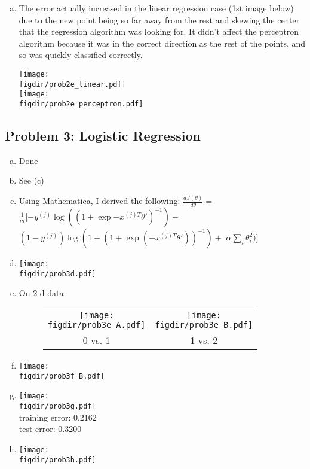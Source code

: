 \documentclass[twoside,11pt]{article}
\newcommand{\figdir}{figs}
\theoremstyle{definition}
\begin{document}
\begin{enumerate}[(a)]
\item The error actually increased in the linear regression case (1st image below) due to the new point being so far away from the rest and skewing the center that the regression algorithm was looking for.
It didn't affect the perceptron algorithm because it was in the correct direction as the rest of the points, and so was quickly classified correctly.

\texttt{[image: \\figdir/prob2e\_linear.pdf]} \\
\texttt{[image: \\figdir/prob2e\_perceptron.pdf]}

\end{enumerate}


\subsection*{Problem 3: Logistic Regression}

\begin{enumerate}[(a)]
\item Done
\item See (c)

\item Using Mathematica, I derived the following:
$\frac{d J(\theta)}{d\theta} =$ $\frac{1}{m}[-y^{(j)}\log((1+\exp{-x^{(j)T}\theta'})^{-1}) - $
$(1-y^{(j)})\log(1-(1+\exp(-x^{(j)T}\theta'))^{-1}) +$ $\alpha\sum_i\theta_i^{2})]$ \\


\item \texttt{[image: \\figdir/prob3d.pdf]}

\item On 2-d data:
\begin{figure}[h!] \centering
\begin{tabular}{cc}
\texttt{[image: \\figdir/prob3e\_A.pdf]} &
\texttt{[image: \\figdir/prob3e\_B.pdf]} \\
0 vs. 1 & 1 vs. 2
\end{tabular}
\end{figure}

\item \texttt{[image: \\figdir/prob3f\_B.pdf]}

\item \texttt{[image: \\figdir/prob3g.pdf]} \\
training error: 0.2162 \\
test error: 0.3200

\item \texttt{[image: \\figdir/prob3h.pdf]}


\end{enumerate}
\end{document}
